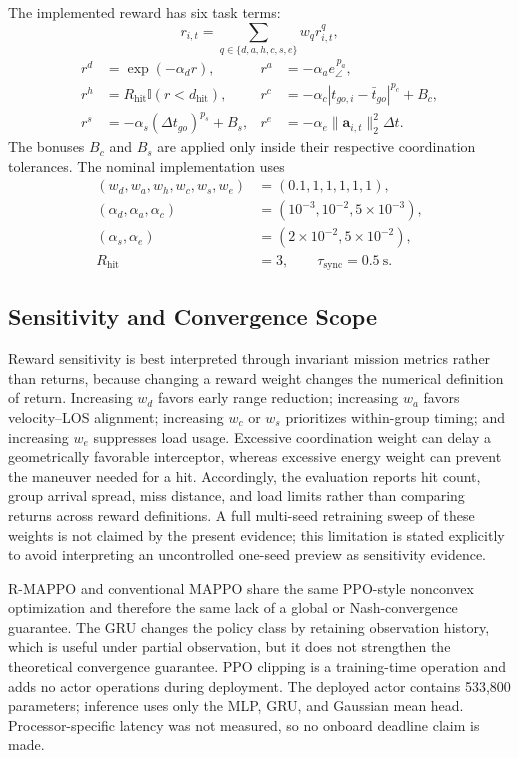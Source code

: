 \documentclass[lettersize,journal]{IEEEtran}
\begin{document}
{The implemented reward has six task terms:
\begin{equation}
\label{eq:reward_function}
r_{i,t}=\sum_{q\in\{d,a,h,c,s,e\}}w_q r_{i,t}^{q},
\end{equation}
\begin{align}
r^d&=\exp(-\alpha_d r),&
r^a&=-\alpha_a e_\angle^{\,p_a},\\
r^h&=R_{\mathrm{hit}}\mathbb I(r<d_{\mathrm{hit}}),&
r^c&=-\alpha_c|t_{go,i}-\bar t_{go}|^{p_c}
+B_c,\\
r^s&=-\alpha_s(\Delta t_{go})^{p_s}+B_s,&
r^e&=-\alpha_e\|\mathbf a_{i,t}\|_2^2\Delta t .
\end{align}
The bonuses \(B_c\) and \(B_s\) are applied only inside their respective
coordination tolerances. The nominal implementation uses
\begin{align*}
(w_d,w_a,w_h,w_c,w_s,w_e)&=(0.1,1,1,1,1,1),\\
(\alpha_d,\alpha_a,\alpha_c)&=(10^{-3},10^{-2},5{\times}10^{-3}),\\
(\alpha_s,\alpha_e)&=(2{\times}10^{-2},5{\times}10^{-2}),\\
R_{\mathrm{hit}}&=3,\qquad \tau_{\mathrm{sync}}=0.5~\mathrm{s}.
\end{align*}

\subsection{Sensitivity and Convergence Scope}
\label{subsec:reward_sensitivity}

Reward sensitivity is best interpreted through invariant mission metrics rather
than returns, because changing a reward weight changes the numerical definition
of return. Increasing \(w_d\) favors early range reduction; increasing \(w_a\)
favors velocity--LOS alignment; increasing \(w_c\) or \(w_s\) prioritizes
within-group timing; and increasing \(w_e\) suppresses load usage. Excessive
coordination weight can delay a geometrically favorable interceptor, whereas
excessive energy weight can prevent the maneuver needed for a hit. Accordingly,
the evaluation reports hit count, group arrival spread, miss distance, and load
limits rather than comparing returns across reward definitions. A full
multi-seed retraining sweep of these weights is not claimed by the present
evidence; this limitation is stated explicitly to avoid interpreting an
uncontrolled one-seed preview as sensitivity evidence.

R-MAPPO and conventional MAPPO share the same PPO-style nonconvex optimization
and therefore the same lack of a global or Nash-convergence guarantee. The GRU
changes the policy class by retaining observation history, which is useful under
partial observation, but it does not strengthen the theoretical convergence
guarantee. PPO clipping is a training-time operation and adds no actor operations
during deployment. The deployed actor contains 533,800 parameters; inference
uses only the MLP, GRU, and Gaussian mean head. Processor-specific latency was
not measured, so no onboard deadline claim is made.

}
\end{document}
